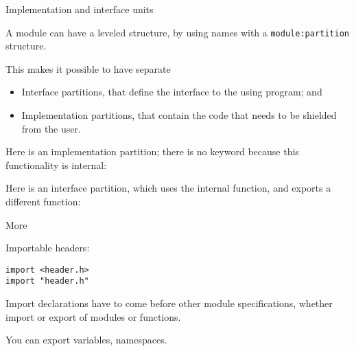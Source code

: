  {Implementation and interface units}

A module can have a leveled structure, by using names with a
\lstinline{module:partition} structure.

This makes it possible to have separate
\begin{itemize}
\item Interface partitions, that define the interface to the using program; and
\item Implementation partitions, that contain the code that needs to
  be shielded from the user.
\end{itemize}

Here is an implementation partition; there is no  keyword
because this functionality is internal:
%

Here is an interface partition, which uses the internal function,
and exports a different function:
%

 {More}

Importable headers:
\begin{lstlisting}
import <header.h>
import "header.h"
\end{lstlisting}

Import declarations have to come before other module specifications,
whether import or export of modules or functions.

You can export variables, namespaces.
